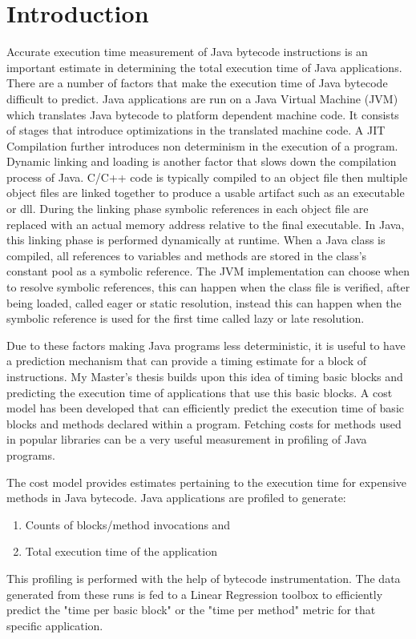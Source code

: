 \chapter{Introduction}
\label{introchap}
Accurate execution time measurement of Java bytecode instructions is an important estimate in determining the total execution time of Java applications. There are a number of factors that make the execution time of Java bytecode difficult to predict. Java applications are run on a Java Virtual Machine (JVM) which translates Java bytecode to platform dependent machine code. It consists of stages that introduce optimizations in the translated machine code. A JIT Compilation further introduces non determinism in the execution of a program. Dynamic linking and loading is another factor that slows down the compilation process of Java. C/C++ code is typically compiled to an object file then multiple object files are linked together to produce a usable artifact such as an executable or dll. During the linking phase symbolic references in each object file are replaced with an actual memory address relative to the final executable. In Java, this linking phase is performed dynamically at runtime. When a Java class is compiled, all references to variables and methods are stored in the class's constant pool as a symbolic reference. The JVM implementation can choose when to resolve symbolic references, this can happen when the class file is verified, after being loaded, called eager or static resolution, instead this can happen when the symbolic reference is used for the first time called lazy or late resolution. \newline


Due to these factors making Java programs less deterministic, it is useful to have a prediction mechanism that can provide a timing estimate for a block of instructions. My Master's thesis builds upon this idea of timing basic blocks and predicting the execution time of applications that use this basic blocks. A cost model has been developed that can efficiently predict the execution time of basic blocks and methods declared within a program. Fetching costs for methods used in popular libraries can be a very useful measurement in profiling of Java programs.\newline


The cost model provides estimates pertaining to the execution time for expensive methods in Java bytecode. Java applications are profiled to generate: 
\begin{enumerate}
\item Counts of blocks/method invocations and 
\item Total execution time of the application  
\end{enumerate}
This profiling is performed with the help of bytecode instrumentation. The data generated from these runs is fed to a Linear Regression toolbox to efficiently predict the "time per basic block" or the "time per method" metric for that specific application.\newline


